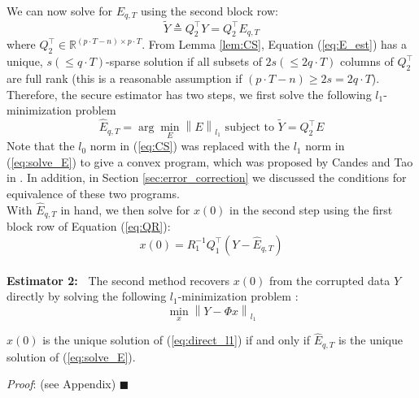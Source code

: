 \documentclass[../../thesis.tex]{subfiles}
\newcommand{\norm}[1]{\left\lVert#1\right\rVert}
\begin{document}
We can now solve for $E_{q,T}$ using the second block row:
\begin{equation}
	\tilde Y \triangleq Q_2^\top Y = Q_2^\top E_{q,T}
	\label{eq:E_est}
\end{equation}
where $Q_2^\top \in \mathbb {R} ^{ (p\cdot T-n) \times p\cdot T}$. From Lemma \ref{lem:CS}, Equation (\ref{eq:E_est}) has a unique, $s(\le q\cdot T)$-sparse solution if all subsets of $2s(\le2 q\cdot T)$ columns of $Q_2^\top$ are full rank (this is a reasonable assumption if $ (p\cdot T-n) \ge 2s = 2q\cdot T$). 
Therefore, the secure estimator has two steps, we first solve the following $l_1$-minimization problem
\begin{equation}
	\hat E_{q,T} = \arg \min_E \norm { E}_{l_1} \text{ subject to } \tilde Y = Q_2^\top E 
	\label{eq:solve_E}
\end{equation}
Note that the $l_0$ norm in (\ref{eq:CS}) was replaced with the $l_1$ norm in (\ref{eq:solve_E}) to give a convex program, which was proposed by Candes and Tao in \cite{tao11}. In addition, in Section \ref{sec:error_correction} we discussed the conditions for equivalence of these two programs.\\
With $\hat E_{q,T}$ in hand, we then solve for $x(0)$ in the second step using the first block row of Equation (\ref{eq:QR}):
\begin{equation}
	x(0) = R_1^{-1} Q_1^\top (Y- \hat E_{q,T})
	\label{eq:QR1}
\end{equation}
\\
{\bf Estimator 2:~} 
The second method recovers $x(0)$ from the corrupted data $Y$ directly by %
solving the following $l_1$-minimization problem \cite{tao11}:
\begin{equation}
	\min_x \norm { Y  - \Phi x}_{l_1}
	\label{eq:direct_l1}
\end{equation}

\begin{lem} \label{lem:equivalent}
 $x(0)$ is the unique solution of (\ref{eq:direct_l1}) if and only if ${\hat E}_{q,T}$ is the unique solution of (\ref{eq:solve_E}).
\end{lem}

\textit{Proof}: (see Appendix) \hfill$\blacksquare$
\end{document}
